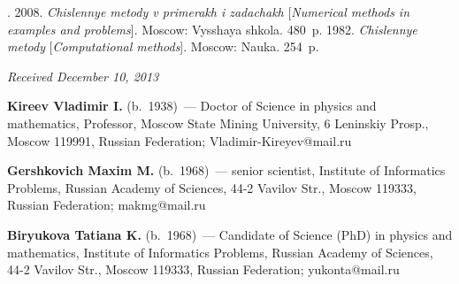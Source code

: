 \begin{multicols}{2}
{{\begin{thebibliography}{9}
. 
2008. \textit{Chislennye metody v primerakh i zadachakh} 
[\textit{Numerical methods in examples and problems}].  Moscow: Vysshaya shkola. 480~p.
 1982. 
\textit{Chislennye metody} [\textit{Computational methods}].  Moscow: Nauka. 254~p.  
\end{thebibliography}
} }


\end{multicols}

\vspace*{-6pt}

\hfill{\small\textit{Received December 10, 2013}}

\vspace*{-18pt}

\Contr

\noindent
\textbf{Kireev Vladimir I.} (b.\ 1938)~--- Doctor of Science in physics and 
mathematics, Professor, Moscow State Mining University, 6 Leninskiy Prosp.,
Moscow 119991, Russian Federation; Vladimir-Kireyev@mail.ru

\vspace*{2pt}

\noindent
\textbf{Gershkovich Maxim M.} (b.\ 1968)~--- senior scientist, Institute of 
Informatics Problems, Russian Academy of
Sciences, 44-2 Vavilov Str., Moscow 119333, Russian Federation; makmg@mail.ru

\vspace*{2pt}

\noindent
\textbf{Biryukova Tatiana K.} (b.\ 1968)~--- Candidate of Science (PhD)
in physics and mathematics, Institute of 
Informatics Problems, Russian Academy of
Sciences, 44-2 Vavilov Str., Moscow 119333, Russian Federation; yukonta@mail.ru



 \label{end\stat}
 
\renewcommand{\bibname}{\protect\rm Литература}